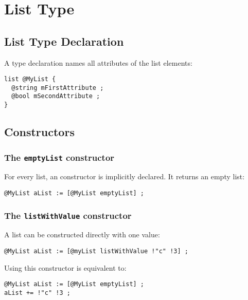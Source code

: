 
\chapter{List Type}

\section{List Type Declaration}

A  type declaration names all attributes of the list elements:

\begin{lstlisting}[language=galgas]
list @MyList {
  @string mFirstAttribute ;
  @bool mSecondAttribute ;
}
\end{lstlisting}

\section{Constructors}

\subsection{The \texttt{emptyList} constructor}

For every list, an  constructor is implicitly declared. It returns an empty list:

\begin{lstlisting}[language=galgas]
@MyList aList := [@MyList emptyList] ;
\end{lstlisting}


\subsection{The \texttt{listWithValue} constructor}

A list can be constructed directly with one value:

\begin{lstlisting}[language=galgas]
@MyList aList := [@myList listWithValue !"c" !3] ;
\end{lstlisting}


Using this constructor is equivalent to:

\begin{lstlisting}[language=galgas]
@MyList aList := [@MyList emptyList] ;
aList += !"c" !3 ;
\end{lstlisting}

